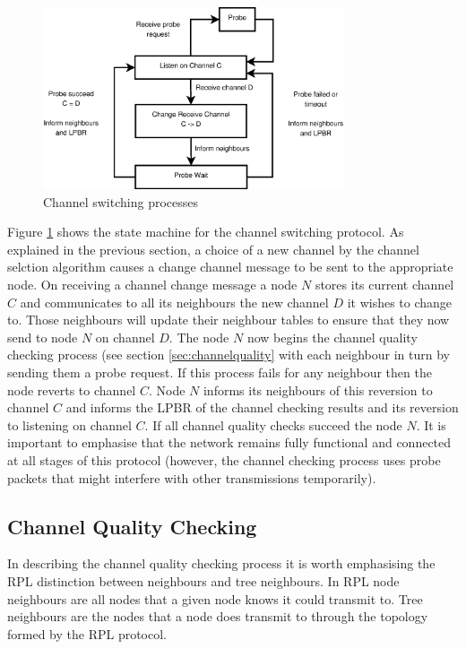 
\begin{figure}
\centering
\includegraphics[width=3.5in]{Diagram1.eps}
\caption{Channel switching processes}
\label{fig_sim}
\end{figure}

Figure \ref{fig_sim} shows the state machine for the channel switching protocol.
As explained in the previous section, a choice of a new channel by the channel selction algorithm causes a change channel message to be sent to the appropriate node. 
On receiving a channel change message a node $N$ stores its current channel $C$ and communicates to all its neighbours the new channel $D$ it wishes to change to.  Those neighbours will update their neighbour tables to ensure that they now send to node $N$ on channel $D$.  The node $N$ now begins the channel quality checking process (see section \ref{sec:channelquality} with each neighbour in turn by sending them a probe request.  If this process fails for any neighbour then the node reverts to channel $C$.  Node $N$ informs its neighbours of this reversion to channel $C$ and informs the LPBR of the channel checking results and its reversion to listening on channel $C$.  If all channel quality checks succeed the node $N$.  It is important to emphasise that the network remains fully functional and connected at all stages of this protocol (however, the channel checking process uses probe packets that might interfere with other transmissions temporarily).

\subsection{Channel Quality Checking}

In describing the channel quality checking process it is worth emphasising the RPL distinction between neighbours and tree neighbours.  In RPL node neighbours are all nodes that a given node knows it could transmit to.  Tree neighbours are the nodes that a node does transmit to through the topology formed by the RPL protocol.

